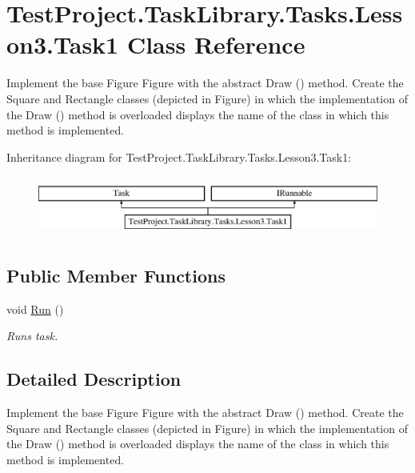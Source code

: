 \hypertarget{class_test_project_1_1_task_library_1_1_tasks_1_1_lesson3_1_1_task1}{}\section{Test\+Project.\+Task\+Library.\+Tasks.\+Lesson3.\+Task1 Class Reference}
\label{class_test_project_1_1_task_library_1_1_tasks_1_1_lesson3_1_1_task1}


Implement the base Figure Figure with the abstract Draw () method. Create the Square and Rectangle classes (depicted in Figure) in which the implementation of the Draw () method is overloaded displays the name of the class in which this method is implemented.  


Inheritance diagram for Test\+Project.\+Task\+Library.\+Tasks.\+Lesson3.\+Task1\+:\begin{figure}[H]
\begin{center}
\leavevmode
\includegraphics[height=2.000000cm]{class_test_project_1_1_task_library_1_1_tasks_1_1_lesson3_1_1_task1}
\end{center}
\end{figure}
\subsection*{Public Member Functions}
\begin{DoxyCompactItemize}
\item 
void \mbox{\hyperlink{class_test_project_1_1_task_library_1_1_tasks_1_1_lesson3_1_1_task1_ac1fa7006556b6719afec0bca93313b4d}{Run}} ()
\begin{DoxyCompactList}\small\item\em Runs task. \end{DoxyCompactList}\end{DoxyCompactItemize}


\subsection{Detailed Description}
Implement the base Figure Figure with the abstract Draw () method. Create the Square and Rectangle classes (depicted in Figure) in which the implementation of the Draw () method is overloaded displays the name of the class in which this method is implemented. 



